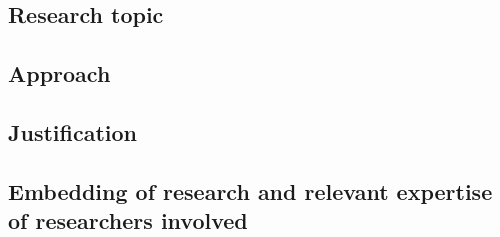 \documentclass[a4paper,10pt,fleqn]{application}
\begin{document}
\subsection{Research topic}



\subsection{Approach}


\subsection{Justification}


\subsection{Embedding of research and relevant expertise of researchers involved}
\end{document}
